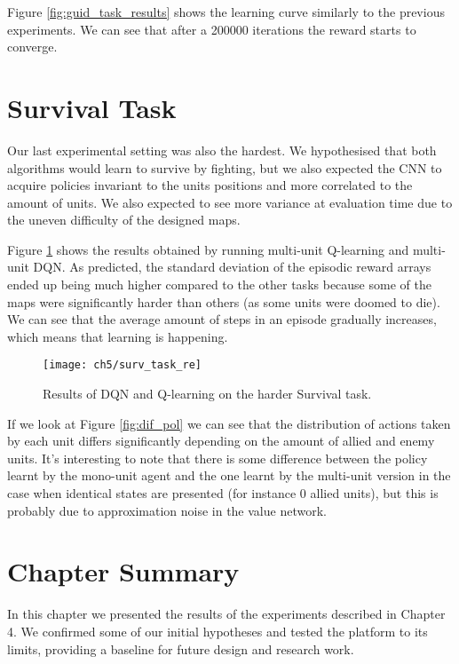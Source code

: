 Figure \ref{fig:guid_task_results} shows the learning curve similarly to the
previous experiments. We can see that after a 200000 iterations the reward
starts to converge. 

\section{Survival Task}

Our last experimental setting was also the hardest. We hypothesised that both
algorithms would learn to survive by fighting, but we also expected the CNN to
acquire policies invariant to the units positions and more correlated to the
amount of units. We also expected to see more variance at evaluation time due to
the uneven difficulty of the designed maps.


Figure \ref{fig:surv_task_results} shows the results obtained by running
multi-unit Q-learning and multi-unit DQN. As predicted, the standard deviation
of the episodic reward arrays ended up being much higher compared to the other
tasks because some of the maps were significantly harder than others (as some
units were doomed to die). We can see that the average amount of steps in an
episode gradually increases, which means that learning is happening.

\begin{figure}[h]
    \centering
    \texttt{[image: ch5/surv\_task\_re]}
    \caption{Results of DQN and Q-learning on the harder Survival task.}
    \label{fig:surv_task_results}
\end{figure}

If we look at Figure \ref{fig:dif_pol} we can see that the distribution of
actions taken by each unit differs significantly depending on the amount of
allied and enemy units. It's interesting to note that there is some difference
between the policy learnt by the mono-unit agent and the one learnt by the
multi-unit version in the case when identical states are presented (for instance
0 allied units), but this is probably due to approximation noise in the
value network.



\section{Chapter Summary}

In this chapter we presented the results of the experiments described in Chapter
4. We confirmed some of our initial hypotheses and tested the platform to its
limits, providing a baseline for future design and research work.
